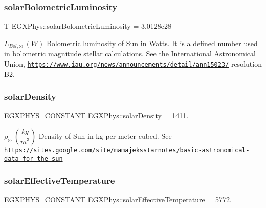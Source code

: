 \subsubsection{\texorpdfstring{solar\+Bolometric\+Luminosity}{solarBolometricLuminosity}}
{\footnotesize\ttfamily T E\+G\+X\+Phys\+::solar\+Bolometric\+Luminosity = 3.\+0128e28}

$L_{Bol,\odot} \ (W)$ Bolometric luminosity of Sun in Watts. It is a defined number used in bolometric magnitude stellar calculations. See the International Astronomical Union, \href{https://www.iau.org/news/announcements/detail/ann15023/}{\tt https\+://www.\+iau.\+org/news/announcements/detail/ann15023/} resolution B2. \mbox{\label{group___e_g_x_phys-_constants-_astrophysics-_solar_system-_sun-_bulk_gad529e58b7a92599270e10726d55b72c2}} 
\subsubsection{\texorpdfstring{solar\+Density}{solarDensity}}
{\footnotesize\ttfamily \mbox{\hyperlink{group___e_g_x_phys-_constants-_macros_ga76980d288494ce1714c9ac68a95ba702}{E\+G\+X\+P\+H\+Y\+S\+\_\+\+C\+O\+N\+S\+T\+A\+NT}} E\+G\+X\+Phys\+::solar\+Density = 1411.}

$\rho_{\odot} \ (\dfrac{kg}{m^3})$ Density of Sun in kg per meter cubed. See \href{https://sites.google.com/site/mamajeksstarnotes/basic-astronomical-data-for-the-sun}{\tt https\+://sites.\+google.\+com/site/mamajeksstarnotes/basic-\/astronomical-\/data-\/for-\/the-\/sun} \mbox{\label{group___e_g_x_phys-_constants-_astrophysics-_solar_system-_sun-_bulk_gaa1a1a67eb8247ed92dc7869afbcfbdc3}} 
\subsubsection{\texorpdfstring{solar\+Effective\+Temperature}{solarEffectiveTemperature}}
{\footnotesize\ttfamily \mbox{\hyperlink{group___e_g_x_phys-_constants-_macros_ga76980d288494ce1714c9ac68a95ba702}{E\+G\+X\+P\+H\+Y\+S\+\_\+\+C\+O\+N\+S\+T\+A\+NT}} E\+G\+X\+Phys\+::solar\+Effective\+Temperature = 5772.}


